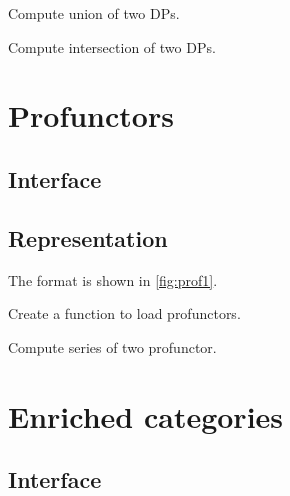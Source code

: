 \begin{exercise}
Compute union of two DPs.
%
\end{exercise}

\begin{exercise}
Compute intersection of two DPs.
%
\end{exercise}


\section{Profunctors}




\label{sec:exercises-profunctors}

\subsection*{Interface}


\subsection*{Representation}

The format is shown in \cref{fig:prof1}.




\begin{exercise}
Create a function to load profunctors.

%

\end{exercise}


\begin{exercise}
Compute series of two profunctor.
%
\end{exercise}


\section{Enriched categories}

\subsection*{Interface}

